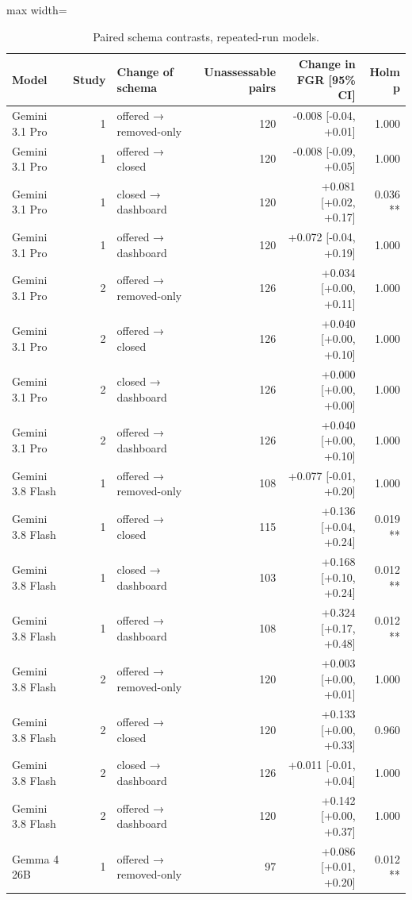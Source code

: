 \documentclass[10pt,twocolumn]{article}
\begin{document}
\begin{table}[t]
\centering\footnotesize\setlength{\tabcolsep}{4pt}
\caption{Paired schema contrasts, repeated-run models.}
\label{tab:23}
\begin{adjustbox}{max width=\textwidth}
\begin{tabular}{lrlrrr}
\toprule
\textbf{Model} & \textbf{Study} & \textbf{Change of schema} & \textbf{Unassessable pairs} & \textbf{Change in FGR [95\% CI]} & \textbf{Holm p} \\
\midrule
Gemini 3.1 Pro & 1 & offered → removed-only & 120 & -0.008 [-0.04, +0.01] & 1.000 \\
Gemini 3.1 Pro & 1 & offered → closed & 120 & -0.008 [-0.09, +0.05] & 1.000 \\
Gemini 3.1 Pro & 1 & closed → dashboard & 120 & +0.081 [+0.02, +0.17] & 0.036 ** \\
Gemini 3.1 Pro & 1 & offered → dashboard & 120 & +0.072 [-0.04, +0.19] & 1.000 \\
Gemini 3.1 Pro & 2 & offered → removed-only & 126 & +0.034 [+0.00, +0.11] & 1.000 \\
Gemini 3.1 Pro & 2 & offered → closed & 126 & +0.040 [+0.00, +0.10] & 1.000 \\
Gemini 3.1 Pro & 2 & closed → dashboard & 126 & +0.000 [+0.00, +0.00] & 1.000 \\
Gemini 3.1 Pro & 2 & offered → dashboard & 126 & +0.040 [+0.00, +0.10] & 1.000 \\
Gemini 3.8 Flash & 1 & offered → removed-only & 108 & +0.077 [-0.01, +0.20] & 1.000 \\
Gemini 3.8 Flash & 1 & offered → closed & 115 & +0.136 [+0.04, +0.24] & 0.019 ** \\
Gemini 3.8 Flash & 1 & closed → dashboard & 103 & +0.168 [+0.10, +0.24] & 0.012 ** \\
Gemini 3.8 Flash & 1 & offered → dashboard & 108 & +0.324 [+0.17, +0.48] & 0.012 ** \\
Gemini 3.8 Flash & 2 & offered → removed-only & 120 & +0.003 [+0.00, +0.01] & 1.000 \\
Gemini 3.8 Flash & 2 & offered → closed & 120 & +0.133 [+0.00, +0.33] & 0.960 \\
Gemini 3.8 Flash & 2 & closed → dashboard & 126 & +0.011 [-0.01, +0.04] & 1.000 \\
Gemini 3.8 Flash & 2 & offered → dashboard & 120 & +0.142 [+0.00, +0.37] & 1.000 \\
Gemma 4 26B & 1 & offered → removed-only & 97 & +0.086 [+0.01, +0.20] & 0.012 ** \\

\end{tabular}
\end{adjustbox}
\end{table}
\end{document}
